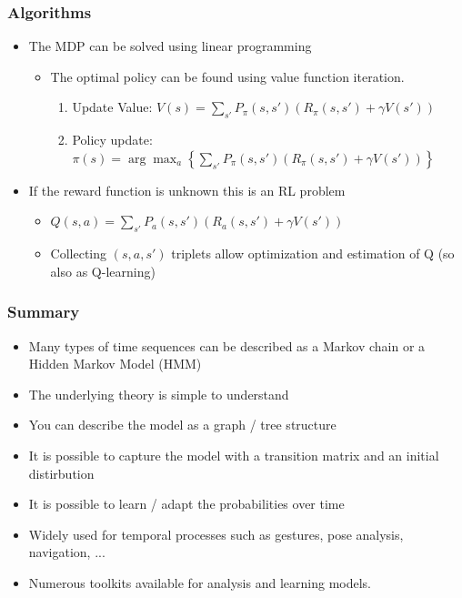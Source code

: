 \documentclass[10pt]{beamer}
\begin{document}
\begin{frame}
  \frametitle{Algorithms}
  \begin{itemize}
  \item The MDP can be solved using linear programming
    \begin{itemize}
    \item The optimal policy can be found using value function iteration.
      \begin{enumerate}
      \item Update Value: $V(s) = \sum_{s'} P_{\pi}(s,s') (R_{\pi}(s,s') + \gamma V(s'))$
      \item Policy update: $\pi(s) = \arg\max_a \left\{ \sum_{s'} P_{\pi}(s,s') (R_{\pi}(s,s') + \gamma V(s'))\right\}$
      \end{enumerate}
    \end{itemize}
  \item If the reward function is unknown this is an RL problem
    \begin{itemize}
    \item $Q(s,a) = \sum_{s'} P_{a}(s,s') (R_{a}(s,s') + \gamma V(s'))$
    \item Collecting $(s,a,s')$ triplets allow optimization and estimation of Q (so also as Q-learning)
    \end{itemize}
  \end{itemize}
\end{frame}


\begin{frame}
  \frametitle{Summary}
  \begin{itemize}
  \item Many types of time sequences can be described as a Markov chain or a Hidden Markov Model (HMM)
  \item The underlying theory is simple to understand
  \item You can describe the model as a graph / tree structure
  \item It is possible to capture the model with a transition matrix and an initial distirbution
  \item It is possible to learn / adapt the probabilities over time
  \item Widely used for temporal processes such as gestures, pose analysis, navigation, ...
  \item Numerous toolkits available for analysis and learning models.
  \end{itemize}
\end{frame}
\end{document}
